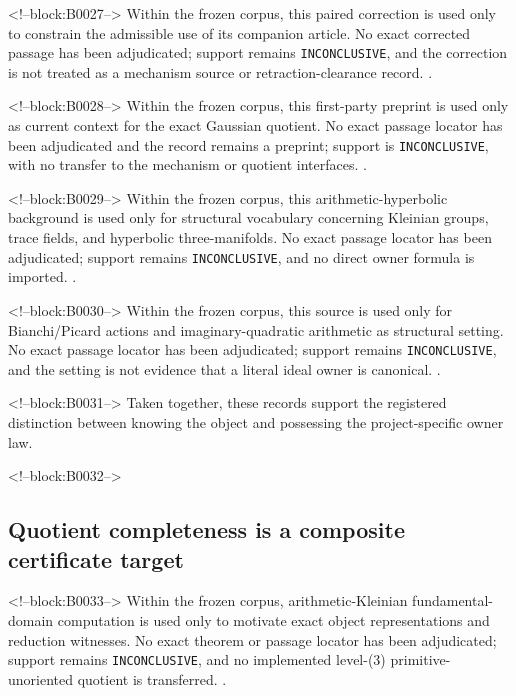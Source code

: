 \documentclass[11pt,a4paper]{article}
\begin{document}
<!--block:B0027-->
Within the frozen corpus, this paired correction is used only to constrain the admissible use of its companion article. No exact corrected passage has been adjudicated; support remains \texttt{INCONCLUSIVE}, and the correction is not treated as a mechanism source or retraction-clearance record.
\citep{P29-S07}.

<!--block:B0028-->
Within the frozen corpus, this first-party preprint is used only as current context for the exact Gaussian quotient. No exact passage locator has been adjudicated and the record remains a preprint; support is \texttt{INCONCLUSIVE}, with no transfer to the mechanism or quotient interfaces.
\citep{P29-S09}.

<!--block:B0029-->
Within the frozen corpus, this arithmetic-hyperbolic background is used only for structural vocabulary concerning Kleinian groups, trace fields, and hyperbolic three-manifolds. No exact passage locator has been adjudicated; support remains \texttt{INCONCLUSIVE}, and no direct owner formula is imported.
\citep{P29-S17}.

<!--block:B0030-->
Within the frozen corpus, this source is used only for Bianchi/Picard actions and imaginary-quadratic arithmetic as structural setting. No exact passage locator has been adjudicated; support remains \texttt{INCONCLU\allowbreak{}SIVE}, and the setting is not evidence that a literal ideal owner is canonical.
\citep{P29-S18}.

<!--block:B0031-->
Taken together, these records support the registered distinction between knowing the object and possessing the project-specific owner law.

<!--block:B0032-->
\subsection{Quotient completeness is a composite certificate target}

<!--block:B0033-->
Within the frozen corpus, arithmetic-Kleinian fundamental-domain computation is used only to motivate exact object representations and reduction witnesses. No exact theorem or passage locator has been adjudicated; support remains \texttt{INCONCLUSIVE}, and no implemented level-(3) primitive-unoriented quotient is transferred.
\citep{P29-S10}.
\end{document}

